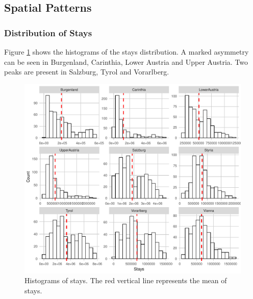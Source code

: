 \documentclass[a4paper,reqno,]{article}
\begin{document}
\newpage
\clearpage
\subsection{Spatial Patterns}
\label{ssec:s_pat}
\subsubsection{Distribution of Stays}
\label{ssec:s_pat_stays}
Figure \ref{fig:hist} shows the histograms of the stays distribution. A marked asymmetry can be seen in Burgenland, Carinthia, Lower Austria and Upper Austria. Two peaks are present in Salzburg, Tyrol and Vorarlberg.
\begin{figure}[H]
\centering
\begin{minipage}[b]{1\textwidth}
\centering
    \includegraphics[width=1\textwidth]{images/EA/Hist_ori.pdf}
\caption{Histograms of stays. The red vertical line represents the mean of stays.}
       \label{fig:hist}
\end{minipage}
\end{figure} 
\newpage
\end{document}
